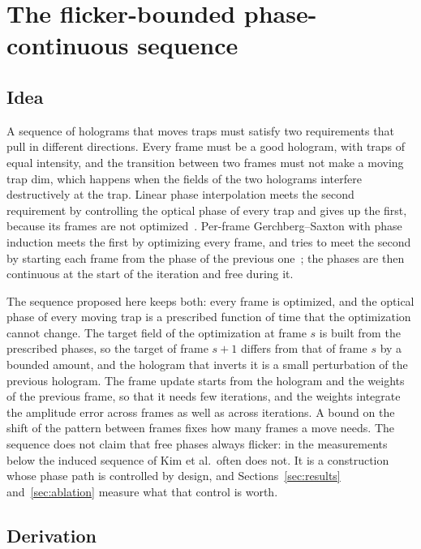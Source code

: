 \section{The flicker-bounded phase-continuous sequence}\label{sec:flicker-method}

\subsection{Idea}

A sequence of holograms that moves traps must satisfy two requirements that pull in different directions. Every frame must be a good hologram, with traps of equal intensity, and the transition between two frames must not make a moving trap dim, which happens when the fields of the two holograms interfere destructively at the trap. Linear phase interpolation meets the second requirement by controlling the optical phase of every trap and gives up the first, because its frames are not optimized~\cite{lpi}. Per-frame Gerchberg--Saxton with phase induction meets the first by optimizing every frame, and tries to meet the second by starting each frame from the phase of the previous one~\cite{kimoe}; the phases are then continuous at the start of the iteration and free during it.

The sequence proposed here keeps both: every frame is optimized, and the optical phase of every moving trap is a prescribed function of time that the optimization cannot change. The target field of the optimization at frame $s$ is built from the prescribed phases, so the target of frame $s+1$ differs from that of frame $s$ by a bounded amount, and the hologram that inverts it is a small perturbation of the previous hologram. The frame update starts from the hologram and the weights of the previous frame, so that it needs few iterations, and the weights integrate the amplitude error across frames as well as across iterations. A bound on the shift of the pattern between frames fixes how many frames a move needs. The sequence does not claim that free phases always flicker: in the measurements below the induced sequence of Kim et al.\ often does not. It is a construction whose phase path is controlled by design, and Sections~\ref{sec:results} and~\ref{sec:ablation} measure what that control is worth.

\subsection{Derivation}

